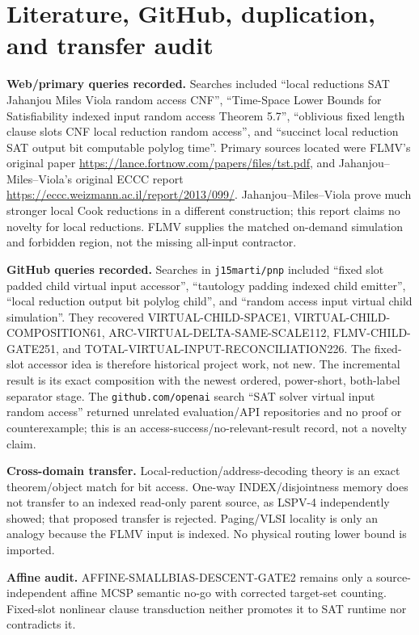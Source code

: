 \documentclass[11pt]{article}
\begin{document}
\section{Literature, GitHub, duplication, and transfer audit}
\textbf{Web/primary queries recorded.}  Searches included ``local reductions SAT Jahanjou Miles Viola random access CNF'', ``Time-Space Lower Bounds for Satisfiability indexed input random access Theorem 5.7'', ``oblivious fixed length clause slots CNF local reduction random access'', and ``succinct local reduction SAT output bit computable polylog time''.  Primary sources located were FLMV's original paper
\url{https://lance.fortnow.com/papers/files/tst.pdf}, and Jahanjou--Miles--Viola's original ECCC report
\url{https://eccc.weizmann.ac.il/report/2013/099/}.  Jahanjou--Miles--Viola prove much stronger local Cook reductions in a different construction; this report claims no novelty for local reductions.  FLMV supplies the matched on-demand simulation and forbidden region, not the missing all-input contractor.

\textbf{GitHub queries recorded.}  Searches in \texttt{j15marti/pnp} included ``fixed slot padded child virtual input accessor'', ``tautology padding indexed child emitter'', ``local reduction output bit polylog child'', and ``random access input virtual child simulation''.  They recovered VIRTUAL-CHILD-SPACE1, VIRTUAL-CHILD-COMPOSITION61, ARC-VIRTUAL-DELTA-SAME-SCALE112, FLMV-CHILD-GATE251, and TOTAL-VIRTUAL-INPUT-RECONCILIATION226.  The fixed-slot accessor idea is therefore historical project work, not new.  The incremental result is its exact composition with the newest ordered, power-short, both-label separator stage.  The \texttt{github.com/openai} search ``SAT solver virtual input random access'' returned unrelated evaluation/API repositories and no proof or counterexample; this is an access-success/no-relevant-result record, not a novelty claim.

\textbf{Cross-domain transfer.}  Local-reduction/address-decoding theory is an exact theorem/object match for bit access.  One-way INDEX/disjointness memory does not transfer to an indexed read-only parent source, as LSPV-4 independently showed; that proposed transfer is rejected.  Paging/VLSI locality is only an analogy because the FLMV input is indexed.  No physical routing lower bound is imported.

\textbf{Affine audit.}  AFFINE-SMALLBIAS-DESCENT-GATE2 remains only a source-independent affine MCSP semantic no-go with corrected target-set counting.  Fixed-slot nonlinear clause transduction neither promotes it to SAT runtime nor contradicts it.
\end{document}
